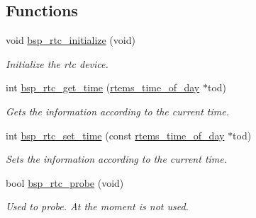 \subsection*{Functions}
\begin{DoxyCompactItemize}
\item 
\mbox{\label{arm_2lpc176x_2rtc_2rtc-config_8c_ad606cbffb9b6cec52e7ef620acd3e835}} 
void \mbox{\hyperlink{arm_2lpc176x_2rtc_2rtc-config_8c_ad606cbffb9b6cec52e7ef620acd3e835}{bsp\+\_\+rtc\+\_\+initialize}} (void)
\begin{DoxyCompactList}\small\item\em Initialize the rtc device. \end{DoxyCompactList}\item 
int \mbox{\hyperlink{arm_2lpc176x_2rtc_2rtc-config_8c_a1d585829e114b224948f12d20ff2cdab}{bsp\+\_\+rtc\+\_\+get\+\_\+time}} (\mbox{\hyperlink{structrtems__time__of__day}{rtems\+\_\+time\+\_\+of\+\_\+day}} $\ast$tod)
\begin{DoxyCompactList}\small\item\em Gets the information according to the current time. \end{DoxyCompactList}\item 
int \mbox{\hyperlink{arm_2lpc176x_2rtc_2rtc-config_8c_afd88bd5c47a2878aa8bb815078cb38ae}{bsp\+\_\+rtc\+\_\+set\+\_\+time}} (const \mbox{\hyperlink{structrtems__time__of__day}{rtems\+\_\+time\+\_\+of\+\_\+day}} $\ast$tod)
\begin{DoxyCompactList}\small\item\em Sets the information according to the current time. \end{DoxyCompactList}\item 
bool \mbox{\hyperlink{arm_2lpc176x_2rtc_2rtc-config_8c_ab3b17932563f0f719652ad72fbfe5ad9}{bsp\+\_\+rtc\+\_\+probe}} (void)
\begin{DoxyCompactList}\small\item\em Used to probe. At the moment is not used. \end{DoxyCompactList}\end{DoxyCompactItemize}
